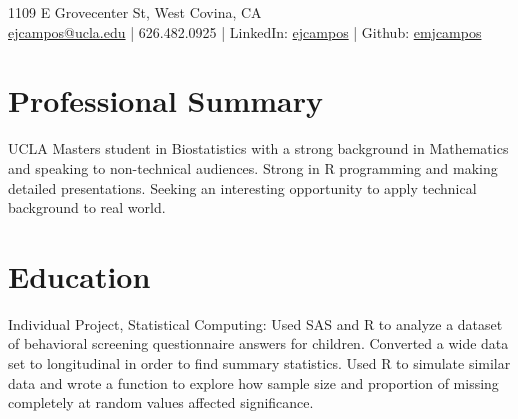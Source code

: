 \documentclass[]{deedy-resume-openfont}
\begin{document}
\lastupdated

 { 
1109 E Grovecenter St, West Covina, CA \\
\href{mailto:ejcampos@ucla.edu}{ejcampos@ucla.edu} | 626.482.0925 | LinkedIn: \href{https://www.linkedin.com/in/ejcampos/}{ejcampos} | Github: \href{https://www.github.com/emjcampos/}{emjcampos}
}

\section{Professional Summary} 
\begin{flushleft}
UCLA Masters student in Biostatistics with a strong background in Mathematics and speaking to non-technical audiences. Strong in R programming and making detailed presentations. Seeking an interesting opportunity to apply technical background to real world.
\end{flushleft}

\section{Education} 

\vspace{-.25em}
\begin{tightemize} 
\item Individual Project, Statistical Computing: Used SAS and R to analyze a dataset of behavioral screening questionnaire answers for children. Converted a wide data set to longitudinal in order to find summary statistics. Used R to simulate similar data and wrote a function to explore how sample size and proportion of missing completely at random values affected significance.
\end{tightemize}
\sectionsep
\end{document}
